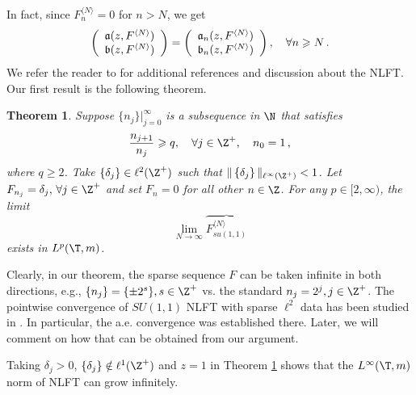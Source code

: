 \documentclass[twoside,a4paper]{amsart}
\def\ge{\geqslant}
\newtheorem{theorem}{Theorem}[section]
\theoremstyle{remark}
\numberwithin{equation}{section}
\begin{document}
 In fact, since $F_n^{\langle N\rangle}=0$ for $n>N$,  we get 
\[
\left(\begin{array}{c}
\frak{a}(z,F^{\langle N\rangle})\\
\frak{b}(z,F^{\langle N\rangle}) 
\end{array}\right)=\left(\begin{array}{c}
\frak{a}_n(z,F^{\langle N\rangle})\\
\frak{b}_n(z,F^{\langle N\rangle}) 
\end{array}\right), \quad \forall n\ge N\,.
\]
We refer the reader to  \cite{tt,den26,kov,kov1,st,musc,Jelena} for additional references and discussion about the NLFT. 
Our first result is the following theorem.
\begin{theorem}\label{t1}Suppose $\{n_j\}|_{j=0}^\infty$ is a subsequence in $\N$ that satisfies 
\begin{equation}\label{spar}
\frac{n_{j+1}}{n_j}\ge q, \quad \forall j\in \Z^+, \quad n_0=1\,,
\end{equation}
where $q\ge 2$. Take $\{\delta_j\}\in \ell^2(\Z^+)$ such that $\|\left\{\delta_j\right\}\|_{\ell^\infty(\Z^+)}<1$. Let $F_{n_j}=\delta_j, \, \forall j\in \Z^+$ and set $F_n=0$ for all other $n\in \Z$. For any $p\in [2,\infty)$, the limit
 \[
 \lim_{N\to\infty}\overbrace{F_{su(1,1)}^{\langle N\rangle}}
 \]
 exists in $L^p(\T,m)$.




\end{theorem}

  Clearly, in our theorem, the sparse sequence $F$ can be taken infinite in both directions, e.g., $\{n_j\}=\{\pm 2^s\}, s\in \Z^+$ vs. the standard $n_j=2^j, j\in \Z^+$.
The pointwise convergence of $SU(1,1)$ NLFT with sparse $\ell^2$ data has been studied in \cite{Jelena}. In particular,  the a.e. convergence was established there. Later, we will comment on how that can be obtained from our argument.\medskip

 Taking $\delta_j>0$, $\{\delta_j\}\notin \ell^1(\Z^+)$ and $z=1$ in Theorem \ref{t1} shows that the $L^\infty(\T,m)$ norm of NLFT can grow infinitely.
\medskip
\end{document}
